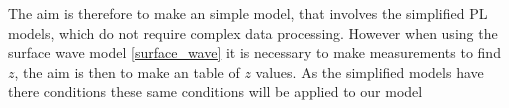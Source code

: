  The aim is therefore to make an simple model, that involves the simplified PL models, which do not require complex data processing. However when using the surface wave model \eqref{surface_wave} it is necessary to make measurements to find $z$, the aim is then to make an table of $z$ values. As the simplified models have there conditions these same conditions will be applied to our model \\



     
